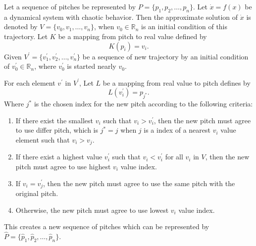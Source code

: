 \documentclass[11pt]{article}
\begin{document}
Let a sequence of pitches be represented by $P = \{p_1, p_2, \dots, p_n\}$. Let $\dot{x} = f(x)$ be a dynamical system with chaotic behavior. Then the approximate solution of $\dot{x}$ is denoted by $V = \{v_0, v_1, \dots, v_n\}$, when $v_0 \in \mathbb{R}_n$ is an initial condition of this trajectory. Let $K$ be a mapping from pitch to real value defined by 
$$K(p_i) = v_i.$$ 
Given $V^\prime = \{ v^\prime_1, v^\prime_2, \dots, v^\prime_n \}$ be a sequence of new trajectory by an initial condition of $v^\prime_0 \in \mathbb{R}_n$, where $v^\prime_0$ is started nearly $v_0$.

For each element $v^\prime$ in $V^\prime$, Let $L$ be a mapping from real value to pitch defines by 
$$L(v^\prime_i) = p_{j^*}.$$ 
Where $j^*$ is the chosen index for the new pitch according to the following criteria:
\begin{enumerate}
  \item If there exist the smallest $v_i$ such that $v_i > v^\prime_i$, then the new pitch must agree to use differ pitch, which is $j^* = j$ when $j$ is a index of a nearest $v_i$ value element such that $v_i > v_j$.
  \item If there exist a highest value $v^\prime_i$ such that $v_i < v^\prime_i$ for all $v_i$ in $V$, then the new pitch must agree to use highest $v_i$ value index. 
  \item If $v_i = v^\prime_j$, then the new pitch must agree to use the same pitch with the original pitch. 
  \item Otherwise, the new pitch must agree to use lowest $v_i$ value index.
\end{enumerate}
This creates a new sequence of pitches which can be represented by $\hat{P} =\{ \hat{p}_1, \hat{p}_2, \dots, \hat{p}_n \}$.
\end{document}
